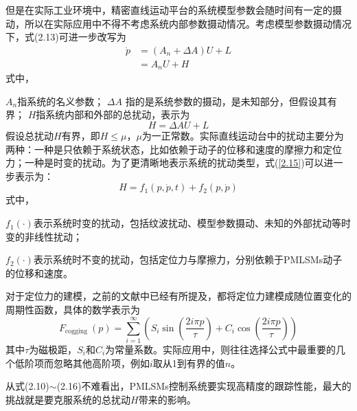 但是在实际工业环境中，精密直线运动平台的系统模型参数会随时间有一定的摄动，所以在实际应用中不得不考虑系统内部参数摄动情况。考虑模型参数摄动情况下，式(2.13)可进一步改写为
\begin{equation}
\label{2.14}
\begin{aligned}
\ddot{p}&=({{A}_{n}}+\Delta A)U+L \\ 
&={A}_{n}U+H  
\end{aligned}
\end{equation}
式中，

$A_n$指系统的名义参数；
$\Delta A$ 指的是系统参数的摄动，是未知部分，但假设其有界；
$H$指系统内部和外部的总扰动，表示为
\begin{equation}
\label{2.15}
H=\Delta AU+L
\end{equation}
假设总扰动$H$有界，即$H\le\mu$，$\mu$为一正常数。实际直线运动台中的扰动主要分为两种：一种是只依赖于系统状态，比如依赖于动子的位移和速度的摩擦力和定位力；一种是时变的扰动。为了更清晰地表示系统的扰动类型，式(\ref{2.15})可以进一步表示为：
\begin{equation}
H={{f}_{1}}(p,\dot{p},t)+{{f}_{2}}(p,\dot{p})
\end{equation}
式中，

$f_1(\cdot)$表示系统时变的扰动，包括纹波扰动、模型参数摄动、未知的外部扰动等时变的非线性扰动；

$f_2(\cdot)$表示系统时不变的扰动，包括定位力与摩擦力，分别依赖于PMLSMs动子的位移和速度。

对于定位力的建模，之前的文献中已经有所提及\cite{yao2011adaptive,song2017iterative}，都将定位力建模成随位置变化的周期性函数，具体的数学表示为
\begin{equation}
F_{\text {cogging }}(p)=\sum_{i=1}^{\infty}\left(S_{i} \sin \left(\frac{2 i \pi p}{\tau}\right)+C_{i} \cos \left(\frac{2 i \pi p}{\tau}\right)\right)
\end{equation}
其中$\tau$为磁极距，$S_i$和$C_i$为常量系数。实际应用中，则往往选择公式中最重要的几个低阶项而忽略其他高阶项，例如$i$取从1到有界的值$n$。

从式(2.10)$\sim$(2.16)不难看出，PMLSMs控制系统要实现高精度的跟踪性能，最大的挑战就是要克服系统的总扰动$H$带来的影响。



